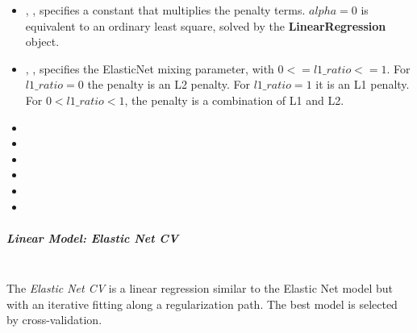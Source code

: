 \begin{itemize}
  \item {}, , specifies a constant
  that multiplies the penalty terms.
  $alpha = 0$ is equivalent to an ordinary least square, solved by the
  \textbf{LinearRegression} object.
  \item {}, , specifies the
  ElasticNet mixing parameter, with $0 <= l1\_ratio <= 1$.
  For $l1\_ratio = 0$ the penalty is an L2 penalty.
  For $l1\_ratio = 1$ it is an L1 penalty.
  For $0 < l1\_ratio < 1$, the penalty is a combination of L1 and L2.
  \item {}
  \item {}
  \item {}
  \item {}
  \item {}
  \item {}
\end{itemize}
\subparagraph{Linear Model: Elastic Net CV}
\mbox{}
\\The \textit{Elastic Net CV} is a linear regression similar to the Elastic Net
model but with an iterative fitting along a regularization path.
%
The best model is selected by cross-validation.
%

